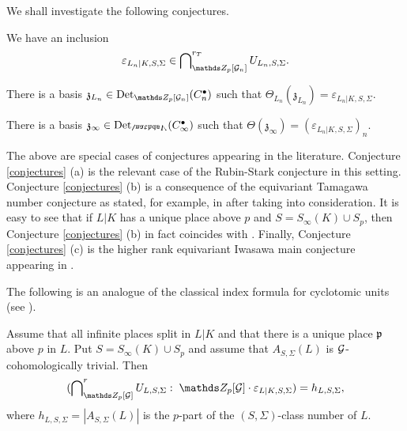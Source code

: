 \documentclass[a4paper, 
headsepline=off, DIV=12, titlepage=false]{scrartcl}
\begin{document}
We shall investigate the following conjectures.

\begin{conjecture} \label{conjectures}
    \begin{liste}
    \item We have an inclusion
    \[
    \varepsilon_{L_n | K, S, \Sigma} \in \bidual^{r_T}_{\Z_p [\cG_n]} U_{L_n, S, \Sigma}.
    \]
    \item There is a basis $\mathfrak{z}_{L_n} \in \Det_{\Z_p [\cG_n]} ( C^\bullet_n)$ such that $\Theta_{L_n} (\mathfrak{z}_{L_n}) = \varepsilon_{L_n | K, S, \Sigma}$. 
    \item There is a basis $\mathfrak{z}_{\infty} \in \Det_\bLambda (C^\bullet_\infty)$ such that $\Theta (\mathfrak{z}_\infty) = (\varepsilon_{L_n | K, S, \Sigma})_n$. 
    \end{liste}
\end{conjecture}

\begin{rk} \label{conjectures-remark}
The above are special cases of conjectures appearing in the literature. Conjecture \ref{conjectures} (a) is the relevant case of the Rubin-Stark conjecture \cite[Conj. B']{Rubin96} in this setting. Conjecture \ref{conjectures} (b) is a consequence of the equivariant Tamagawa number conjecture as stated, for example, in \cite[Conj. 2.3]{BKS2} after taking \cite[Prop. 2.5]{BKS2} into consideration. It is easy to see that if $L | K$ has a unique place above $p$ and $S = S_\infty (K) \cup S_p$, then Conjecture \ref{conjectures} (b) in fact coincides with \cite[Conj. 2.3]{BKS2}. Finally, Conjecture \ref{conjectures} (c) is the higher rank equivariant Iwasawa main conjecture appearing in \cite[Conj. 3.1]{BKS2}. 
\end{rk}

The following is an analogue of the classical index formula for cyclotomic units (see \cite[Thm. 8.2]{Washington}).

\begin{lem} \label{IndexFormula}
Assume that all infinite places split in $L | K$
and that there is a unique place $\mathfrak{p}$ above $p$ in $L$. Put $S = S_\infty (K) \cup S_p$
and assume that $A_{S, \Sigma} (L)$ is $\mathcal{G}$-cohomologically trivial. Then
\[
(\bidual^r_{\Z_p [\cG]} U_{L, S, \Sigma} : \; \Z_p [\cG] \cdot \varepsilon_{L | K, S, \Sigma} ) = h_{L, S, \Sigma}, 
\]
where $h_{L, S, \Sigma} = | A_{S, \Sigma} ( L) |$ is the $p$-part of the $(S, \Sigma)$-class number of $L$. 
\end{lem}
\end{document}
